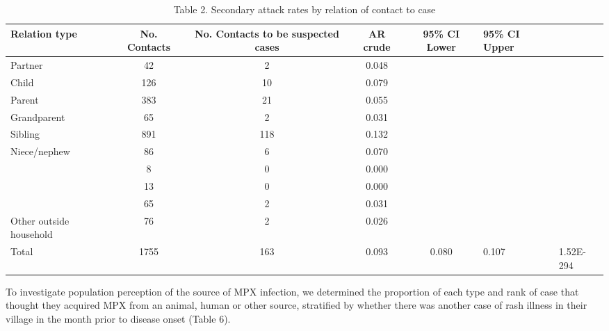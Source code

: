 \begin{table}
\centering 
\caption{Table 2. Secondary attack rates by relation of contact to case}
    \begin{tabular}{@{}lcccc@{}}
    \toprule
     Relation type & No. Contacts & No. Contacts to be suspected cases & AR crude & 95\% CI Lower  & 95\% CI Upper  \\
     \cmidrule
    Partner                 & 42       & 2     & 0.048       & ~              & ~              & ~         \\ 
    Child                   & 126      & 10    & 0.079       & ~              & ~              & ~         \\
    Parent                  & 383      & 21    & 0.055       & ~              & ~              & ~         \\
    Grandparent             & 65       & 2     & 0.031       & ~              & ~              & ~         \\
    Sibling                 & 891      & 118   & 0.132       & ~              & ~              & ~         \\
    Niece/nephew            & 86       & 6     & 0.070       & ~              & ~              & ~         \\
    ~                       & 8        & 0     & 0.000       & ~              & ~              & ~         \\
    ~                       & 13       & 0     & 0.000       & ~              & ~              & ~         \\
    ~                       & 65       & 2     & 0.031       & ~              & ~              & ~         \\
    Other outside household & 76       & 2     & 0.026       & ~              & ~              & ~         \\
    Total                   & 1755     & 163   & 0.093       & 0.080          & 0.107          & 1.52E-294 \\
    \bottomrule
    \end{tabular}
    \label{table2}
\end{table}


To investigate population perception of the source of MPX infection, we determined the proportion of each type and rank of case that thought they acquired MPX from an animal, human or other source, stratified by whether there was another case of rash illness in their village in the month prior to disease onset (Table 6). 
